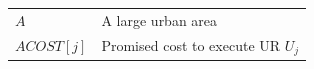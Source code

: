 \begin{longtable}[l]{l l}
$A$              & A large urban area                                                  \\
$ACOST[j]$       & Promised cost to execute UR $U_j$                                   \\
\end{longtable}